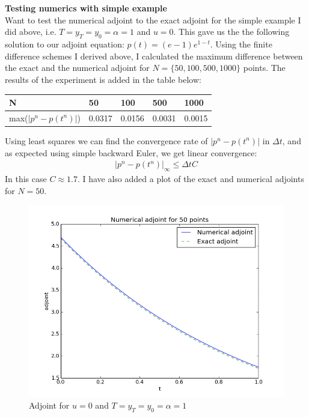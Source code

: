 \documentclass[11pt,a4paper]{report}
\begin{document}
\\
\\
\textbf{Testing numerics with simple example}
\\
Want to test the numerical adjoint to the exact adjoint for the simple example I did above, i.e. $T=y_T=y_0=\alpha=1$ and $u=0$. This gave us the the following solution to our adjoint equation: $p(t)=(e-1)e^{1-t}$. Using the finite difference schemes I derived above, I calculated the maximum difference between the exact and the numerical adjoint for $N=\{50,100,500,1000 \}$ points. The results of the experiment is added in the table below: 
\begin{center}
    \begin{tabular}{| l | l | l | l | l |}
    \hline
    N & 50 & 100  & 500 & 1000 \\ \hline
    max($|p^n-p(t^n)|$) & 0.0317 &0.0156&0.0031 &0.0015 	\\ \hline
    \end{tabular}
\end{center}
Using least squares we can find the convergence rate of $|p^n-p(t^n)|$ in $\Delta t$, and as expected using simple backward Euler, we get linear convergence: 
\begin{align*}
|p^n-p(t^n)|_{\infty} \leq \Delta t C
\end{align*}
In this case $C\approx1.7$. I have also added a plot of the exact and numerical adjoints for $N=50$.
\begin{figure}
  \includegraphics[width=\linewidth]{adjoint_plot.png}
  \caption{Adjoint for $u=0$ and $T=y_T=y_0=\alpha=1$}
  \label{Fig 1}
\end{figure}
\end{document}
